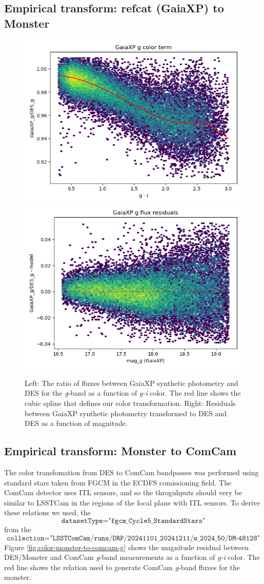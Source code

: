\subsection{Empirical transform: refcat (GaiaXP) to Monster}
\label{sec:todes}
\begin{figure}
    \includegraphics[width=0.49\linewidth]{./figures/color_terms/GaiaXP_to_DES_band_g_color_term.png}
    \includegraphics[width=0.49\linewidth]{./figures/color_terms/GaiaXP_to_DES_band_g_flux_residuals.png}
    \caption{Left: The ratio of fluxes between GaiaXP synthetic photometry and DES for the \textit{g}-band as a function of \textit{g-i} color. The red line shows the cubic spline that defines our color transformation.
    Right: Residuals between GaiaXP synthetic photometry transformed to DES and DES as a function of magnitude.}
    \label{fig:color-xp-g}
\end{figure}


\subsection{Empirical transform: Monster to ComCam}
\label{sec:tocomcam}
The color transfomation from DES to ComCam bandpasses was performed using standard stars taken from FGCM in the ECDFS comissioning field. 
The ComCam detector uses ITL sensors, and so the throguhputs should very be similar to LSSTCam in the regions of the focal plane with ITL sensors. 
To derive these relations we used, the $$\texttt{datasetType="fgcm\_Cycle5\_StandardStars"}$$ from the $$\texttt{collection="LSSTComCam/runs/DRP/20241101\_20241211/w\_2024\_50/DM-48128"}$$
Figure \ref{fig:color-monster-to-comcam-g} shows the magnitude residual between DES/Monster and ComCam \textit{g}-band measurements as a function of \textit{g-i} color. 
The red line shows the relation used to generate ComCam \textit{g}-band fluxes for the monster.

